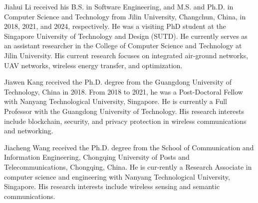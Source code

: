 \documentclass[10pt,journal,compsoc]{IEEEtran}
\begin{document}
\vspace{-10 mm}
\begin{IEEEbiography}{Jiahui Li} received his B.S. in Software Engineering, and M.S. and Ph.D. in Computer Science and Technology from Jilin University, Changchun, China, in 2018, 2021, and 2024, respectively. He was a visiting PhD student at the Singapore University of Technology and Design (SUTD). He currently serves as an assistant researcher in the College of Computer Science and Technology at Jilin University. His current research focuses on integrated air-ground networks, UAV networks, wireless energy transfer, and optimization.
\end{IEEEbiography}


\vspace{-10 mm}
\begin{IEEEbiography}{Jiawen Kang}
received the Ph.D. degree from the Guangdong University of Technology, China in 2018. From 2018 to 2021, he was a Post-Doctoral Fellow with Nanyang Technological University, Singapore. He is currently a Full Professor with the Guangdong University of Technology. His research interests include blockchain, security, and privacy protection in wireless communications and networking.
\end{IEEEbiography}

\vspace{-10 mm}
\begin{IEEEbiography}{Jiacheng Wang}
received the Ph.D. degree from the School of Communication and Information Engineering, Chongqing University of Posts and Telecommunications, Chongqing, China. He is cur-rently a Research Associate in computer science and engineering with Nanyang Technological University, Singapore. His research interests include wireless sensing and semantic communications.
\end{IEEEbiography}
\end{document}
